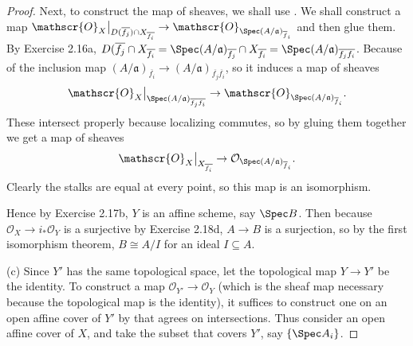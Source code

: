 \begin{proof}
	Next, to construct the map of sheaves, we shall use .
	We shall construct a map $\mathscr{O}_X\big|_{D(\overline{f_j})\cap X_{\overline{f_i} }} \to \mathscr{O}_{\Spec (A / \mathfrak{a})_{\overline{f}_i }} $ and then glue them.
	By Exercise 2.16a, $D(\overline{f_j}\cap X_{\overline{f_i} } = \Spec (A / \mathfrak{a})_{\overline{f_j}} \cap X_{\overline{f_i} } = \Spec (A / \mathfrak{a})_{\overline{f_j} \overline{f_i} }  $.
	Because of the inclusion map $(A / \mathfrak{a})_{\overline{f_i} } \to (A / \mathfrak{a})_{\overline{f_j}\overline{f_i}  } $, so it induces a map of sheaves
	\[
		                   \mathscr{O}_X\big|_{\Spec (A / \mathfrak{a})_{\overline{f_j}\overline{f_i}  }} \to \mathscr{O}_{\Spec (A / \mathfrak{a})_{\overline{f}_i }} 
	.\] 
	These intersect properly because localizing commutes, so by gluing them together we get a map of sheaves
	\[
		\mathscr{O}_X\big|_{X_{\overline{f_i} }}\to \mathcal{O}_{\Spec (A / \mathfrak{a})_{\overline{f}_i }}
	.\] 
	Clearly the stalks are equal at every point, so this map is an isomorphism.

	Hence by Exercise 2.17b, $Y $ is an affine scheme, say $\Spec B$.
	Then because $\mathcal{O}_X \to i_\ast \mathcal{O}_Y$ is a surjective by Exercise 2.18d, $A \to B$ is a surjection, so by the first isomorphism theorem, $B \cong A / I $ for an ideal $I \subseteq A $.

	(c) Since $Y' $ has the same topological space, let the topological map $Y \to Y'$ be the identity.
	To construct a map $\mathcal{O}_{Y'} \to \mathscr{O}_{Y}$ (which is the sheaf map necessary because the topological map is the identity), it suffices to construct one on an open affine cover of $Y' $ by  that agrees on intersections.
	Thus consider an open affine cover of $X $, and take the subset that covers $Y' $, say $\{\Spec A_i\}   $.


\end{proof}
